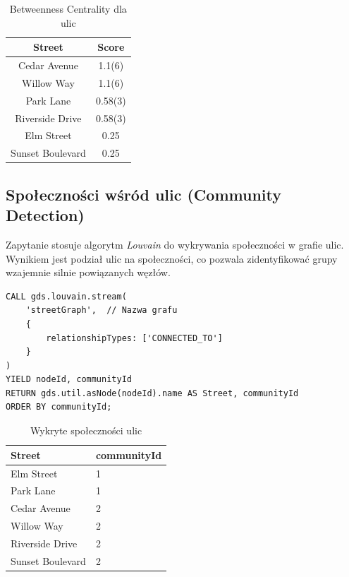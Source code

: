 \documentclass[a4paper,12pt]{article}
\begin{document}
\begin{table}[ht]
\centering
\begin{tabular}{|c|c|}
\hline
\textbf{Street} & \textbf{Score} \\
\hline
Cedar Avenue & 1.1(6) \\
Willow Way & 1.1(6) \\
Park Lane & 0.58(3) \\
Riverside Drive & 0.58(3) \\
Elm Street & 0.25 \\
Sunset Boulevard & 0.25 \\
\hline
\end{tabular}
\caption{Betweenness Centrality dla ulic}
\label{tab:street_scores}
\end{table}

\subsection*{Społeczności wśród ulic (Community Detection)}
Zapytanie stosuje algorytm \textit{Louvain} do wykrywania społeczności w grafie ulic. Wynikiem jest podział ulic na społeczności, co pozwala zidentyfikować grupy wzajemnie silnie powiązanych węzłów.
\begin{verbatim}
CALL gds.louvain.stream(
    'streetGraph',  // Nazwa grafu
    {
        relationshipTypes: ['CONNECTED_TO']
    }
)
YIELD nodeId, communityId
RETURN gds.util.asNode(nodeId).name AS Street, communityId
ORDER BY communityId;
\end{verbatim}

\begin{table}[h!]
\centering
\begin{tabular}{|l|l|}
\hline
\textbf{Street}         & \textbf{communityId} \\ \hline
Elm Street              & 1                    \\ \hline
Park Lane               & 1                    \\ \hline
Cedar Avenue            & 2                   \\ \hline
Willow Way              & 2                    \\ \hline
Riverside Drive         & 2                    \\ \hline
Sunset Boulevard        & 2                    \\ \hline
\end{tabular}
\caption{Wykryte społeczności ulic}
\label{tab:streets_community}
\end{table}
\end{document}
